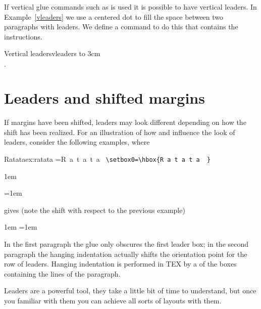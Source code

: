 If vertical glue commands such as  is used it is possible to have
vertical leaders. In Example~\ref{vleaders} we use a centered dot  to fill the space between two paragraphs with leaders. We define a command
 to do this that contains the instructions.

\begin{texexample}{Vertical leaders}{vleaders}
\newcommand{\vdotfill}{%
  \par\leaders\hbox{$\cdot$}\vfill}
  \vbox to 3cm{
  \lorem
  \vdotfill
  \lorem
  }
\end{texexample}





\section{Leaders and shifted margins}

If margins have been shifted, leaders may look different depending on how the shift has been realized.
For an illustration of how and influence the look of leaders, consider
the following examples, where

\begin{texexample}{Ratata}{ex:ratata}
=\hbox{R a t a t a  }
\verb+\setbox0=\hbox{R a t a t a  }+



\hbox{\kern1em\hbox{\leaders{}\hskip5cm}}

\hangindent=1em  \noindent
\leaders{}\hskip5cm\hbox{}\par
\end{texexample}

gives (note the shift with respect to the previous example)
\medskip

{\hbox{\kern1em\hbox{\leaders{}\hskip5cm}}
\hangindent=1em  \noindent
\leaders{}\hskip5cm\hbox{}\par}

In the first paragraph the glue only obscures the first leader box; in the second paragraph
the hanging indentation actually shifts the orientation point for the row of leaders. Hanging
indentation is performed in TEX by a of the boxes containing the lines of the
paragraph.

   

Leaders are a powerful tool, they take a little bit of time to understand, but once you familiar with them you can achieve all sorts of layouts with them.



